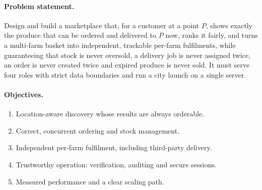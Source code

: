 \documentclass[manuscript,screen,review]{acmart}
\begin{document}
\paragraph{Problem statement.} Design and build a marketplace that, for a customer at a point $P$, shows exactly the produce that can be ordered and delivered to $P$ now, ranks it fairly, and turns a multi-farm basket into independent, trackable per-farm fulfilments, while guaranteeing that stock is never oversold, a delivery job is never assigned twice, an order is never created twice and expired produce is never sold. It must serve four roles with strict data boundaries and run a city launch on a single server.

\paragraph{Objectives.}
\begin{enumerate}
  \item Location-aware discovery whose results are always orderable.
  \item Correct, concurrent ordering and stock management.
  \item Independent per-farm fulfilment, including third-party delivery.
  \item Trustworthy operation: verification, auditing and secure sessions.
  \item Measured performance and a clear scaling path.
\end{enumerate}
\end{document}
